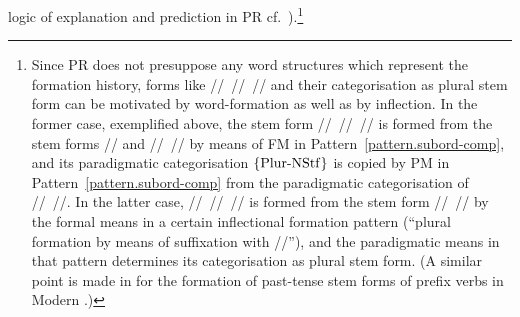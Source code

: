 \documentclass[output=paper
  ,nobabel
  ,draftmode
  ,colorlinks, citecolor=brown
]{langscibook}
\begin{document}
logic of explanation and prediction in PR cf.\ \citealt{nolda:2018:explaining:linguistic}).\footnote{Since PR does not presuppose
any word structures which represent the formation history, forms like
// // // and their categorisation as plural stem form
can be motivated by word-formation as well as by inflection. In the former case,
exemplified above, the stem form // // // is formed from the stem forms // and // // by means of FM in Pattern \ref{pattern.subord-comp}, and its paradigmatic
categorisation $\left\{\smash{\operatorname{Plur-NStf}}\right\}$ is copied by PM in Pattern \ref{pattern.subord-comp} from the paradigmatic
categorisation of // //. In the latter case, // // // is formed from the stem form // // by the formal means in a certain
inflectional formation pattern (``plural formation by means of
suffixation with //''), and the paradigmatic means in that
pattern determines its categorisation as plural stem form. (A similar point is
made in \citet[369]{nolda:2019:wortbildung:flexion} for
the formation of past-tense stem forms of prefix verbs in Modern
.)}
\end{document}
